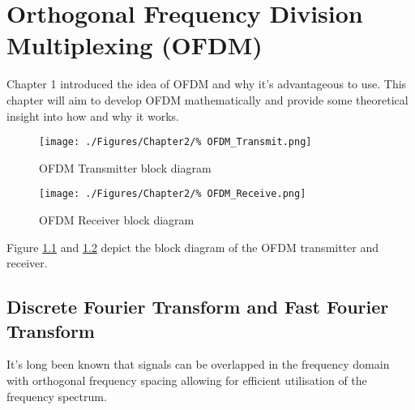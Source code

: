 \chapter{Orthogonal Frequency Division Multiplexing (OFDM)}
\label{chap:OFDM}
Chapter 1 introduced the idea of OFDM and why it's %
advantageous to use. This chapter will aim to develop %
OFDM mathematically and provide some theoretical insight %
into how and why it works.
\begin{figure}[ht]
	\centering
	\texttt{[image: ./Figures/Chapter2/\%
	OFDM\_Transmit.png]}
	\caption{OFDM Transmitter block diagram}
	\label{fig:OFDMTransmit}
\end{figure}
\begin{figure}[ht]
	\centering
	\texttt{[image: ./Figures/Chapter2/\%
	OFDM\_Receive.png]}
	\caption{OFDM Receiver block diagram}
	\label{fig:OFDMReceiver}
\end{figure}
Figure \ref{fig:OFDMTransmit} and \ref{fig:OFDMReceiver} %
depict the block diagram of the OFDM transmitter and receiver.

\section{Discrete Fourier Transform and Fast Fourier Transform}

It's long been known that signals can be overlapped in the %
frequency domain with orthogonal frequency spacing %
allowing for efficient utilisation of the %
frequency spectrum\cite{Chang66}.

